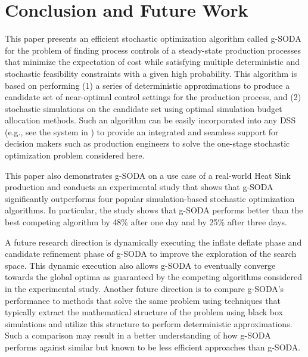 \documentclass[a4paper, 12pt]{article} %
\begin{document}
\section{Conclusion and Future Work}
\label{sec:conclusion}

This paper presents an efficient stochastic optimization algorithm called g-SODA for the problem of finding process controls of a steady-state production processes that minimize the expectation of cost while satisfying multiple deterministic and stochastic feasibility constraints with a given high probability. 
This algorithm is based on performing (1) a series of deterministic approximations to produce a candidate set of near-optimal control settings for the production process, and (2) stochastic simulations on the candidate set using optimal simulation budget allocation methods.  
Such an algorithm can be easily incorporated into any DSS (e.g., see the system in \cite{Brodsky2017ieeebd}) to provide an integrated and seamless support for decision makers such as production engineers to solve the one-stage stochastic optimization problem considered here.

This paper also demonstrates g-SODA on a use case of a real-world Heat Sink production and  conducts an experimental study that shows that g-SODA significantly outperforms four popular simulation-based stochastic optimization algorithms. In particular, the study shows that g-SODA performs better than the best competing algorithm by 48\% after one day and by 25\% after three days.

A future research direction is dynamically executing the inflate deflate phase and candidate refinement phase of g-SODA to improve the exploration of the search space. This dynamic execution also allows g-SODA to eventually converge towards the global optima as guaranteed by the competing algorithms considered in the experimental study. Another future direction is to compare g-SODA's performance to methods that solve the same problem using techniques that typically extract the mathematical structure of the problem using black box simulations and utilize this structure to perform deterministic approximations. Such a comparison may result in a better understanding of how g-SODA performs against similar but known to be less efficient approaches than g-SODA. 

\end{document}
